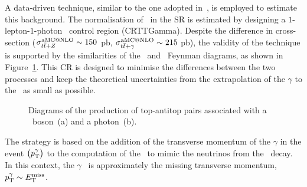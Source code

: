 		A data-driven technique, similar to the one adopted in~\cite{stop1L}, is employed to estimate this background. The normalisation of \ttZ\ in the \ac{SR} is estimated by designing a $1$-lepton-$1$-photon \ttgamma\ control region (CRTTGamma). Despite the difference in cross-section ($\sigma_{t\bar{t}+Z}^{\mathrm{aMC@NLO}} \sim 150$ pb, $\sigma_{t\bar{t}+\gamma}^{\mathrm{aMC@NLO}} \sim 215$ pb), the validity of the technique is supported by the similarities of the \ttZ\ and \ttgamma\ Feynman diagrams, as shown in Figure~\ref{fig:ttZttGamma}. This \ac{CR} is designed to minimise the differences between the two processes and keep the theoretical uncertainties from the extrapolation of the $\gamma$ to the \Zboson\ as small as possible. 

		\begin{figure}[htpb]
		  \centering
		    \caption{Diagrams of the production of top-antitop pairs associated with a \Zboson\ boson~(a) and a photon~(b).}
		    \label{fig:ttZttGamma}
		\end{figure}

		The strategy is based on the addition of the transverse momentum of the $\gamma$ in the event $\left(p_{\mathrm{T}}^{\gamma}\right)$ to the computation of the \met\ to mimic the neutrinos from the \Zboson\ decay. In this context, the $\gamma$ \pt\ is approximately the missing transverse momentum, $p_{\mathrm{T}}^{\gamma} \sim E_{\mathrm{T}}^{\mathrm{miss}}$. 

